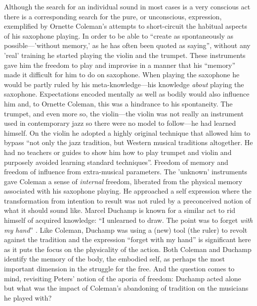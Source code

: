 \documentclass[a4paper]{article}
\begin{document}
Although the search for an individual sound in most cases is a very conscious act there is a corresponding search for the pure, or unconscious, expression, exemplified by Ornette Coleman's attempts to short-circuit the habitual aspects of his saxophone playing. In order to be able to ``create as spontaneously as possible---'without memory,' as he has often been quoted as saying''\citet[p. 117]{litzweiler92}, without any 'real' training he started playing the violin and the trumpet. These instruments gave him the freedom to play and improvise in a manner that his ``memory'' made it difficult for him to do on saxophone. When playing the saxophone he would be partly ruled by his meta-knowledge---his knowledge \emph{about} playing the saxophone. Expectations encoded mentally as well as bodily would also influence him and, to Ornette Coleman, this was a hindrance to his spontaneity. The trumpet, and even more so, the violin---the violin was not really an instrument used in contemporary jazz so there were no model to follow---he had learned himself. On the violin he adopted a highly original technique that allowed him to bypass ``not only the jazz tradition, but Western musical traditions altogether. He had no teachers or guides to show him how to play trumpet and violin and purposely avoided learning standard techniques''.\citet[p. 117]{litzweiler92} Freedom of memory and freedom of influence from extra-musical parameters. The 'unknown' instruments gave Coleman a sense of \emph{internal} freedom, liberated from the physical memory associated with his saxophone playing. He approached a self expression where the transformation from intention to result was not ruled by a preconceived notion of what it should sound like. Marcel Duchamp is known for a similar act to rid himself of acquired knowledge: ``I unlearned to draw. The  point was to forget \emph{with my hand}'' \citep[Duchamp, as quoted in][s.29]{tomkins65}. Like Coleman, Duchamp was using a (new) tool (the ruler) to revolt against the tradition and the expression ``forget with my hand'' is significant here as it puts the focus on the physicality of the action. Both Coleman and Duchamp identify the memory of the body, the embodied self, as perhaps the most important dimension in the struggle for the free. And the question comes to mind, revisiting Peters' notion of the aporia of freedom: Duchamp acted alone but what was the impact of Coleman's abandoning of tradition on the musicians he played with?
\end{document}
